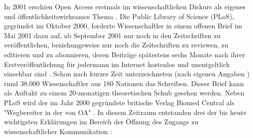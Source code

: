 In 2001 erschien Open Access erstmals im wissenschaftlichen Diskurs als eigenes und öffentlichkeitswirksames Thema \cite{cite:19}. Die Public Library of Science (PLoS), gegründet im Oktober 2000, forderte Wissenschaftler in einem offenen Brief im Mai 2001 dazu auf, ab September 2001 nur noch in den Zeitschriften zu veröffentlichen, beziehungsweise nur noch die Zeitschriften zu reviewen, zu editieren und zu abonnieren, deren Beiträge spätestens sechs Monate nach ihrer Erstveröffentlichung für jedermann im Internet kostenlos und unentgeltlich einsehbar sind \cite{cite:20}. Schon nach kurzer Zeit unterzeichneten (nach eigenen Angaben \cite{cite:19a}) rund 38.000 Wissenschaftler aus 180 Nationen das Schreiben. Dieser Brief kann als Auftakt zu einem 20-monatigen theoretischen Schub gesehen werden. Neben PLoS wird der im Jahr 2000 gegründete britische Verlag Biomed Central als "Wegbereiter in der von OA" \cite{suchen-Hoffmann-Zugang-undVerwertung-öffentlicher-Informationen}. In diesem Zeitraum entstanden drei der bis heute wichtigsten Erklärungen im Bereich der Öffnung des Zugangs zu wissenschaftlicher Kommunikation \cite{CREATe_2014}:

